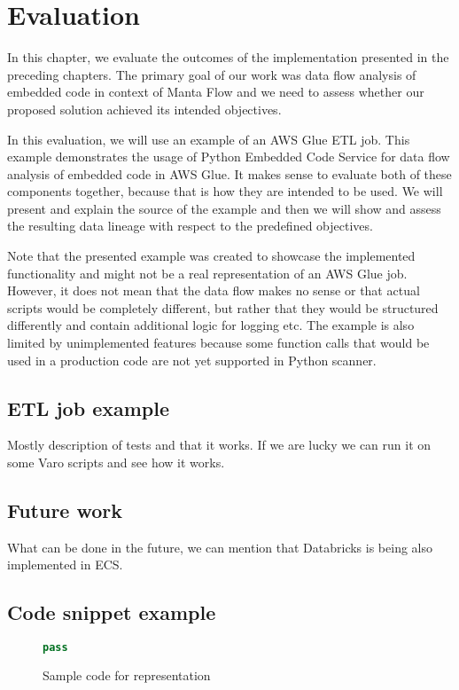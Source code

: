 \chapter{Evaluation}

In this chapter, we evaluate the outcomes of the implementation presented in the preceding chapters. The primary goal of our work was data flow analysis of embedded code in context of Manta Flow and we need to assess whether our proposed solution achieved its intended objectives.
\par
In this evaluation, we will use an example of an AWS Glue ETL job. This example demonstrates the usage of Python Embedded Code Service for data flow analysis of embedded code in AWS Glue. It makes sense to evaluate both of these components together, because that is how they are intended to be used. We will present and explain the source of the example and then we will show and assess the resulting data lineage with respect to the predefined objectives.
\par
Note that the presented example was created to showcase the implemented functionality and might not be a real representation of an AWS Glue job. However, it does not mean that the data flow makes no sense or that actual scripts would be completely different, but rather that they would be structured differently and contain additional logic for logging etc. The example is also limited by unimplemented features because some function calls that would be used in a production code are not yet supported in Python scanner.

\section{ETL job example}






Mostly description of tests and that it works. If we are lucky we can run it on some Varo scripts and see how it works.

\section{Future work}
What can be done in the future, we can mention that Databricks is being also implemented in ECS.

\section{Code snippet example}

\begin{figure}[h!]
\begin{lstlisting}[language=Python] 
pass
\end{lstlisting}
\caption{Sample code for representation}
\label{fig:sample-transform-code}
\end{figure}

